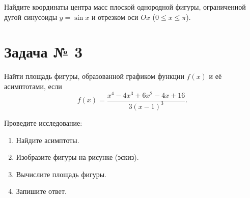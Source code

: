 \documentclass[a4paper,12pt]{article}
\begin{document}
Найдите координаты центра масс плоской однородной фигуры, ограниченной дугой синусоиды \(y = \sin x\) и
отрезком оси \(Ox\) (\(0 \le x \le \pi\)).

\section{Задача № 3}

Найти площадь фигуры, образованной графиком функции \(f(x)\) и её асимптотами, если
\[
  f(x) = \frac{x^4 - 4 x^3 + 6 x^2 - 4 x + 16}{3 {(x-1)}^3}.
\]

Проведите исследование:
\begin{enumerate}
\item Найдите асимптоты.
\item Изобразите фигуры на рисунке (эскиз).
\item Вычислите площадь фигуры.
\item Запишите ответ.
\end{enumerate}
\end{document}
